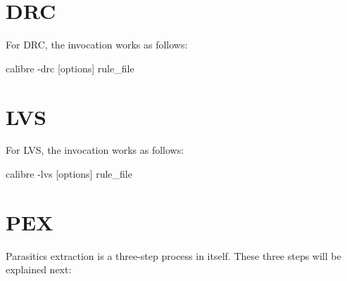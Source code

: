 \section{DRC}
For DRC, the invocation works as follows:

\begin{lstbashplain}
 calibre -drc [options] rule_file
\end{lstbashplain}

\section{LVS}
For LVS, the invocation works as follows:
\begin{lstbashplain}
calibre -lvs [options] rule_file
\end{lstbashplain}

\section{PEX}
Parasitics extraction is a three-step process in itself. These three steps will
be explained next:

